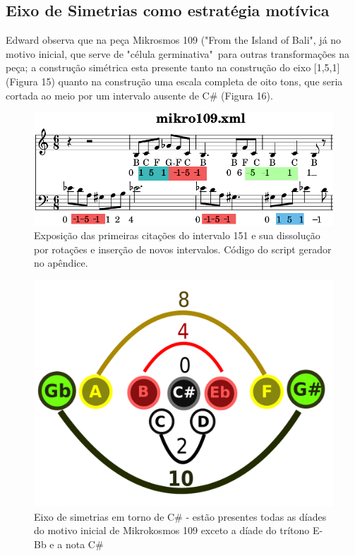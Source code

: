 \documentclass[
	12pt,				%
	openright,			%
	twoside,			%
	a4paper,			%
	english,			%
	french,				%
	spanish,			%
	brazil				%
	]{abntex2}
\begin{document}
\subsection{Eixo de Simetrias como estratégia motívica}

Edward  observa que na peça Mikrosmos 109 ("From the Island of Bali", já no motivo inicial, que serve de "célula germinativa"\ para outras transformações na peça; a construção simétrica esta presente tanto na construção do eixo [1,5,1] (Figura 15) quanto na construção uma escala completa de oito tons, que seria cortada ao meio por um intervalo ausente de C\# (Figura 16).

\begin{figure}[!h]
	\caption{\label{fig_grafico}Exposição das primeiras citações do intervalo 151 e sua dissolução por rotações e inserção de novos intervalos. Código do script gerador no apêndice.}
	\begin{center}
	    \includegraphics[scale=0.4]{estudosM21/contornoM109.png}
	\end{center}
\end{figure}

\begin{figure}[!h]
	\caption{\label{fig_grafico}Eixo de simetrias em torno de C\# - estão presentes todas as díades do motivo inicial de Mikrokosmos 109 exceto a díade do trítono E-Bb e a nota C\#}
	\begin{center}
	    \includegraphics[scale=0.4]{axis/simetriamikro109.pdf}
	\end{center}
\end{figure}
\end{document}
